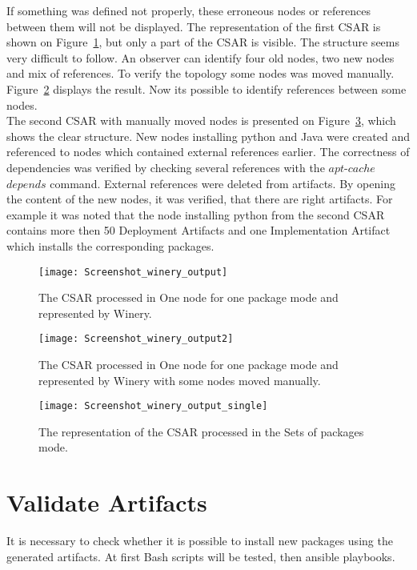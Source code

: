  If something was defined not properly, these erroneous nodes or references between them will not be displayed.
The representation of the first CSAR is shown on Figure~\ref{fig:winery_output}, but only a part of the CSAR is visible.
The structure seems very difficult to follow.
An observer can identify four old nodes, two new nodes and mix of references.
 To verify the topology some nodes was moved manually. 
 Figure~\ref{fig:winery_output2} displays the result. 
 Now its possible to identify references between some nodes.\\
The second CSAR with manually moved nodes is presented on Figure~\ref{fig:winery_output_single}, which shows the clear structure.
New nodes installing python and Java were created and referenced to nodes which contained external references earlier.
 The correctness of dependencies was verified by checking several references with the $apt$-$cache$ $depends$ command.
External references were deleted from artifacts.
By opening the content of the new nodes, it was verified, that there are right artifacts.
For example it was noted that the node installing python from the second CSAR contains more then 50 Deployment Artifacts and one Implementation Artifact which installs the corresponding packages.
 \begin{figure}[ht]   
 	\centering
 	\texttt{[image: Screenshot\_winery\_output]}  
 	\caption{The CSAR processed in One node for one package mode and represented by Winery.}
 	\label{fig:winery_output}
 \end{figure}
 \begin{figure}[ht]   
 	\centering
 	\texttt{[image: Screenshot\_winery\_output2]}
 	\caption{The CSAR processed in One node for one package mode and represented by Winery with some nodes moved manually.}
 	\label{fig:winery_output2}
 \end{figure}
\begin{figure}[ht]   
	\centering
	\texttt{[image: Screenshot\_winery\_output\_single]}
	\caption{The representation of the CSAR processed in the Sets of packages mode.}
	\label{fig:winery_output_single}
\end{figure}
\section{Validate Artifacts}\label{sec:checkart}
It is necessary to check whether it is possible to install new packages using the generated artifacts.
At first Bash scripts will be tested, then ansible playbooks.

